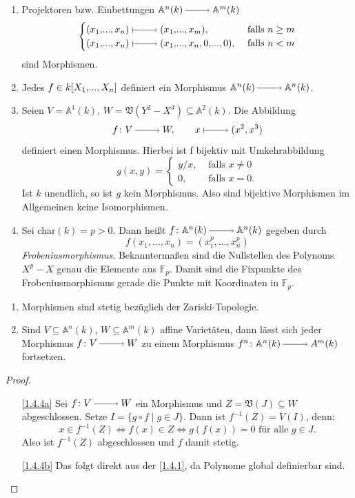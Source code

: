 \documentclass[a4paper,12pt]{scrbook}
\theoremstyle{keinenummern} %
\theoremstyle{mitnummern}
\theoremstyle{unserbeweis}
\newtheorem{proof}{Beweis}
\def\A{\mathbb{A}}
\def\V{\mathfrak{V}}
\newcommand{\FF}{\mathbb{F}}
\renewcommand{\dotsc}{\ensuremath{\!...}}
\newcommand{\ra}{\raisebox{-1pt}{\tikz{\draw[thin,shorten >=3pt, ->] (0,0) node{\hspace*{-2pt}} -- node{} (1,0);}}\penalty1000\relax}
\renewcommand{\mapsto}{\raisebox{-1pt}{\tikz{\draw[thin,shorten >=3pt, |->] (0,0) node{\hspace*{0pt}} -- node{} (1,0);}}\penalty1000\relax}
\newcommand{\polyx}[1][n]{\ensuremath%
  [X_{1},\dotsc,X_{#1}]}
\begin{document}
\begin{bsp}\label{1.4.3}
\begin{enumerate}
\item{}  Projektoren bzw. Einbettungen $\A^{n}(k)\ra \A^{m}(k)$ 
\[\begin{cases} (x_1,\dotsc,x_n) \mapsto (x_1,\dotsc,x_m),&\text{ falls }n\ge m \\ (x_1,\dotsc,x_n)\mapsto (x_1,\dotsc,x_n,0,\dotsc,0),&\text{ falls }n<m \end{cases}\] sind Morphismen.
\item{} Jedes $f \in k\polyx$ definiert ein Morphismus $\A^{n}(k)\ra \A^{n}(k)$.
\item{} Seien $V=\A^1(k)$, $W=\V(Y^2-X^3) \subseteq \A^2(k)$. Die Abbildung 
\[f\colon V\ra W, \qquad x\mapsto (x^2,x^3)\]
definiert einen Morphismus.
Hierbei ist f bijektiv mit Umkehrabbildung 
\[g(x,y)=\begin{cases} y/x,&\text{ falls }x\neq 0 \\ 0,&\text{ falls }x=0. \end{cases}\]
Ist $k$ unendlich, so ist $g$ kein Morphismus. Also sind bijektive Morphismen im Allgemeinen keine Isomorphismen.
\item{} Sei char$(k)=p>0$. Dann heißt $f\colon \A^n(k)\ra \A^n(k)$ gegeben durch 
\[f(x_1,\dotsc,x_n)=(x_1^p,\dotsc,x_n^p)\] 
\emph{Frobeniusmorphismus}. Bekanntermaßen sind die Nullstellen des Polynoms $X^{p}-X$ genau die Elemente aus $\FF_p$. Damit sind die Fixpunkte des Frobeniusmorphismus gerade die Punkte mit Koordinaten in $\FF_p$.
\end{enumerate}
\end{bsp}

\begin{bem}\label{1.4.4}
\begin{enumerate}
\item{} Morphismen sind stetig bezüglich der Zariski-Topologie.
\item{} Sind $V\subseteq \A^n(k)$, $W \subseteq \A^m(k)$ affine Varietäten, dann lässt sich jeder Morphismus $f\colon V\ra W$ zu einem Morphismus $f^n\colon \A^n(k)\ra A^m(k)$ fortsetzen.
\end{enumerate}
\end{bem}

\begin{proof}
\begin{enumerate}
\item[\ref{1.4.4a}] Sei $f\colon V\ra W$ ein Morphismus und $Z=\V(J)\subseteq W$ abgeschlossen. Setze $I=\{g\circ f \mid g\in J\}$. Dann ist $f^{-1}(Z)=V(I)$, denn: 
\[x\in f^{-1}(Z)\iff f(x)\in Z \iff g(f(x))=0\text{ für alle }g\in J.\]
Also ist $f^{-1}(Z)$ abgeschlossen und $f$ damit stetig.
\item[\ref{1.4.4b}] Das folgt direkt aus der \cref{1.4.1}, da Polynome global definierbar sind.
\end{enumerate}
\end{proof}
\end{document}
